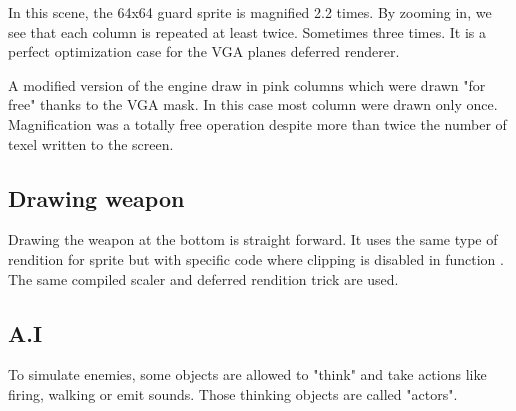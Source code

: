 \par
\begin{figure}[H]
 \centering
\end{figure}
In this scene, the 64x64 guard sprite is magnified 2.2 times. By zooming in, we see that each column is repeated at least twice. Sometimes three times. It is a perfect optimization case for the VGA planes deferred renderer.\\
\par
A modified version of the engine draw in pink columns which were drawn "for free" thanks to the VGA mask. In this case most column were drawn only once. Magnification was a totally free operation despite more than twice the number of texel written to the screen.\\

\par
\begin{figure}[H]
 \centering
\end{figure}
\begin{figure}[H]
 \centering
\end{figure}






\subsection{Drawing weapon}
Drawing the weapon at the bottom is straight forward. It uses the same type of rendition for sprite but with specific code where clipping is disabled in function . The same compiled scaler and deferred rendition trick are used.














\subsection{A.I}
To simulate enemies, some objects are allowed to "think" and take actions like firing, walking or emit sounds. Those thinking objects are called "actors".\\
\par






